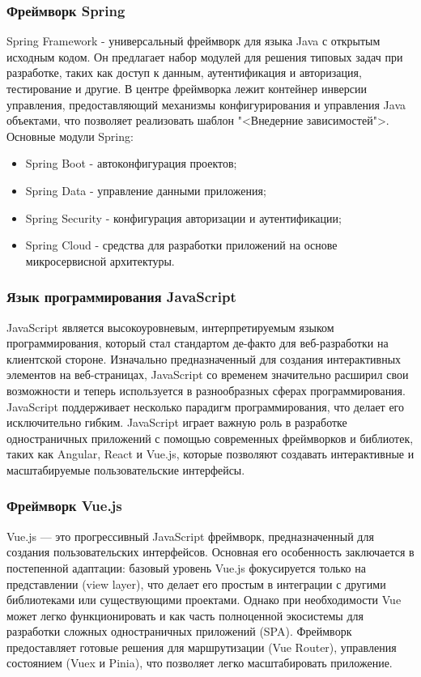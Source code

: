 \subsubsection{Фреймворк Spring}

Spring Framework - универсальный фреймворк для языка Java с открытым исходным кодом. Он предлагает набор модулей для решения типовых задач при разработке, таких как доступ к данным, аутентификация и авторизация, тестирование и другие. В центре фреймворка лежит контейнер инверсии управления, предоставляющий механизмы конфигурирования и управления Java объектами, что позволяет реализовать шаблон "<Внедерние зависимостей">\cite{springboot}.
Основные модули Spring:
\begin{itemize}
	\item Spring Boot - автоконфигурация проектов;
	\item Spring Data - управление данными приложения\cite{persist};
	\item Spring Security - конфигурация авторизации и аутентификации;
	\item Spring Cloud - средства для разработки приложений на основе микросервисной архитектуры\cite{springcloud}.
\end{itemize}

\subsubsection{Язык программирования JavaScript}

JavaScript является высокоуровневым, интерпретируемым языком программирования, который стал стандартом де-факто для веб-разработки на клиентской стороне\cite{js}. Изначально предназначенный для создания интерактивных элементов на веб-страницах, JavaScript со временем значительно расширил свои возможности и теперь используется в разнообразных сферах программирования. JavaScript поддерживает несколько парадигм программирования, что делает его исключительно гибким. 
JavaScript играет важную роль в разработке одностраничных приложений с помощью современных фреймворков и библиотек, таких как Angular, React и Vue.js, которые позволяют создавать интерактивные и масштабируемые пользовательские интерфейсы.

\subsubsection{Фреймворк Vue.js}

Vue.js — это прогрессивный JavaScript фреймворк, предназначенный для создания пользовательских интерфейсов. Основная его особенность заключается в постепенной адаптации: базовый уровень Vue.js фокусируется только на представлении (view layer), что делает его простым в интеграции с другими библиотеками или существующими проектами. Однако при необходимости Vue может легко функционировать и как часть полноценной экосистемы для разработки сложных одностраничных приложений (SPA)\cite{vue}. Фреймворк предоставляет готовые решения для маршрутизации (Vue Router), управления состоянием (Vuex и Pinia), что позволяет легко масштабировать приложение.

